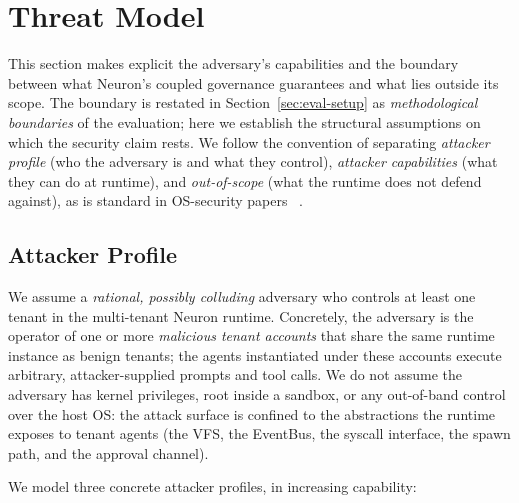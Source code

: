 \section{Threat Model}
\label{sec:threat}

This section makes explicit the adversary's capabilities and the boundary
between what Neuron's coupled governance guarantees and what lies outside
its scope. The boundary is restated in Section~\ref{sec:eval-setup} as
\emph{methodological boundaries} of the evaluation; here we establish the
structural assumptions on which the security claim rests. We follow the
convention of separating \emph{attacker profile} (who the adversary is and
what they control), \emph{attacker capabilities} (what they can do at
runtime), and \emph{out-of-scope} (what the runtime does not defend
against), as is standard in OS-security papers
~\cite{klein2009sel4,mercer2012capsicum}.

\subsection{Attacker Profile}
\label{sec:threat-profile}

We assume a \emph{rational, possibly colluding} adversary who controls at
least one tenant in the multi-tenant Neuron runtime. Concretely, the
adversary is the operator of one or more \emph{malicious tenant accounts}
that share the same runtime instance as benign tenants; the agents
instantiated under these accounts execute arbitrary, attacker-supplied
prompts and tool calls. We do not assume the adversary has kernel
privileges, root inside a sandbox, or any out-of-band control over the
host OS: the attack surface is confined to the abstractions the runtime
exposes to tenant agents (the VFS, the EventBus, the syscall interface,
the spawn path, and the approval channel).

We model three concrete attacker profiles, in increasing capability:

